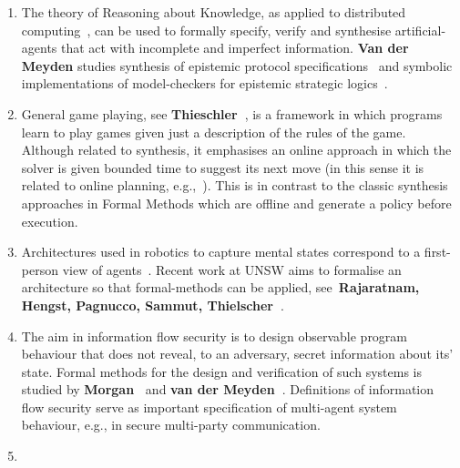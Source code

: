 \documentclass[a4paper,12pt,smallheadings]{scrartcl}
\begin{document}
\begin{enumerate}
\item The theory of Reasoning about Knowledge, as applied to distributed computing~\cite{FHMV95}, can be used to formally specify, verify and synthesise artificial-agents 
that act with incomplete and imperfect information. \textbf{Van der Meyden} studies synthesis of epistemic protocol specifications~\cite{DBLP:conf/concur/MeydenV98,DBLP:journals/corr/HuangM16} and symbolic implementations of model-checkers for epistemic strategic logics~\cite{DBLP:conf/aaai/HuangM14}.

 \item General game playing, see \textbf{Thieschler~\cite{GGP}}, is a framework in which programs learn to play games given just a description of the rules of the game. Although related to synthesis, it emphasises an online approach in which the solver is given bounded time to suggest its next move (in this sense it is related to online planning, e.g.,~\cite{GeffnerBo13}). This is in contrast to the classic synthesis approaches in Formal Methods which are offline and generate a policy before execution. 
 
 \item Architectures used in robotics to capture mental states  correspond to a first-person view of agents~\cite{reiter2001knowledge}. Recent work at UNSW aims to formalise an architecture so that formal-methods can be applied, see~\textbf{Rajaratnam, Hengst, Pagnucco, Sammut, Thielscher~\cite{Rajaratnam2016}}.
 
 \item The aim in information flow security is to design observable program behaviour that does not reveal, to an adversary, secret information about its' state. Formal methods for the design and verification of such systems is studied by \textbf{Morgan~\cite{McIver2011}} and \textbf{van der Meyden~\cite{DBLP:conf/sp/EggertMSW11,DBLP:journals/tcs/CassezMZ16}}.  
 Definitions of information flow security serve as important specification of multi-agent system behaviour, e.g., in secure multi-party communication. 

 \item {}
 
 \end{enumerate}
 
 
 \newpage
 


\end{document}
